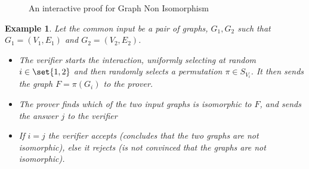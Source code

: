 \documentclass{article}
\newtheorem{example}{Example}
\begin{document}
\begin{figure}[H]
    \centering
    \caption{An interactive proof for Graph Non Isomorphism}
    \label{graphnonisomorphism}
\end{figure}

\begin{example}
    Let the common input be a pair of graphs, $G_1, G_2$ such that $G_1 = (V_1, E_1)$ and $G_2 = (V_2, E_2)$.
    \begin{itemize}
        \item The verifier starts the interaction, uniformly selecting at random $i \in \set{1, 2}$ and then randomly selects a permutation $\pi \in S_{V_i}$.
              It then sends the graph $F = \pi(G_i)$ to the prover.
        \item The prover finds which of the two input graphs is isomorphic to $F$, and sends the answer $j$ to the verifier
        \item If $i = j$ the verifier accepts (concludes that the two graphs are not isomorphic), else it rejects (is not convinced that the graphs are not isomorphic).
    \end{itemize}
\end{example}
\end{document}
